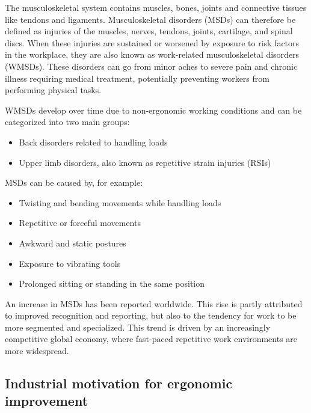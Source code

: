 \documentclass[11pt,a4paper,twoside,openright]{book}
\begin{document}
The musculoskeletal system contains muscles, bones, joints and connective tissues like tendons and ligaments. Musculoskeletal disorders (MSDs) can therefore be defined as injuries of the muscles, nerves, tendons, joints, cartilage, and spinal discs. When these injuries are sustained or worsened by exposure to risk factors in the workplace, they are also known as work-related musculoskeletal disorders (WMSDs). These disorders can go from minor aches to severe pain and chronic illness requiring medical treatment, potentially preventing workers from performing physical tasks. 

WMSDs develop over time due to non-ergonomic working conditions and can be categorized into two main groups:
\vspace{0.2cm} 
\begin{itemize}[noitemsep, topsep=0pt]
	\item Back disorders related to handling loads
	\item Upper limb disorders, also known as repetitive strain injuries (RSIs)
\end{itemize}
\vspace{0.3cm}
MSDs can be caused by, for example:
\vspace{0.2cm}
\begin{itemize}[noitemsep, topsep=0pt]
    \item Twisting and bending movements while handling loads
    \item Repetitive or forceful movements 
    \item Awkward and static postures
    \item Exposure to vibrating tools
    \item Prolonged sitting or standing in the same position
\end{itemize}
\vspace{0.3cm}

\newpage

An increase in MSDs has been reported worldwide. This rise is partly attributed to improved recognition and reporting, but also to the tendency for work to be more segmented and specialized. This trend is driven by an increasingly competitive global economy, where fast-paced repetitive work environments are more widespread.

\subsection{Industrial motivation for ergonomic improvement}
\end{document}
